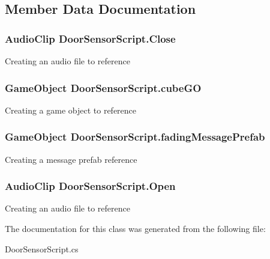 \subsection{Member Data Documentation}
\hypertarget{class_door_sensor_script_a8cdc54e500df0194633b1aa6830460a9}{
\subsubsection[{Close}]{\setlength{\rightskip}{0pt plus 5cm}Audio\-Clip Door\-Sensor\-Script.\-Close}}\label{class_door_sensor_script_a8cdc54e500df0194633b1aa6830460a9}
Creating an audio file to reference \hypertarget{class_door_sensor_script_a3ac7f794c8f0553a80a7ff9f5ea1717a}{
\subsubsection[{cube\-G\-O}]{\setlength{\rightskip}{0pt plus 5cm}Game\-Object Door\-Sensor\-Script.\-cube\-G\-O}}\label{class_door_sensor_script_a3ac7f794c8f0553a80a7ff9f5ea1717a}
Creating a game object to reference \hypertarget{class_door_sensor_script_abeeac4e7d1793824f6eacb8939e746be}{
\subsubsection[{fading\-Message\-Prefab}]{\setlength{\rightskip}{0pt plus 5cm}Game\-Object Door\-Sensor\-Script.\-fading\-Message\-Prefab}}\label{class_door_sensor_script_abeeac4e7d1793824f6eacb8939e746be}
Creating a message prefab reference \hypertarget{class_door_sensor_script_a5e5b72d9a89f93da35dcd2377f0435c0}{
\subsubsection[{Open}]{\setlength{\rightskip}{0pt plus 5cm}Audio\-Clip Door\-Sensor\-Script.\-Open}}\label{class_door_sensor_script_a5e5b72d9a89f93da35dcd2377f0435c0}
Creating an audio file to reference 

The documentation for this class was generated from the following file\-:\begin{DoxyCompactItemize}
\item 
Door\-Sensor\-Script.\-cs\end{DoxyCompactItemize}
